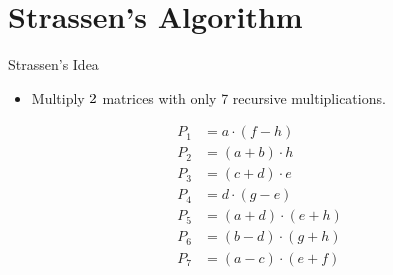 \documentclass{beamer}
\begin{document}
\section{Strassen's Algorithm}

\begin{frame}{Strassen's Idea}
    \begin{itemize}
        \item Multiply $2 \time 2$ matrices with only 7 recursive multiplications.
    \end{itemize}
    \begin{equation*}
        \begin{split}
            P_1 &= a \cdot (f - h) \\
            P_2 &= (a + b) \cdot h \\
            P_3 &= (c + d) \cdot e \\
            P_4 &= d \cdot (g - e) \\
            P_5 &= (a + d) \cdot (e + h) \\
            P_6 &= (b - d) \cdot (g + h) \\
            P_7 &= (a - c) \cdot (e + f) \\
        \end{split}
    \end{equation*}
\end{frame}
\end{document}

